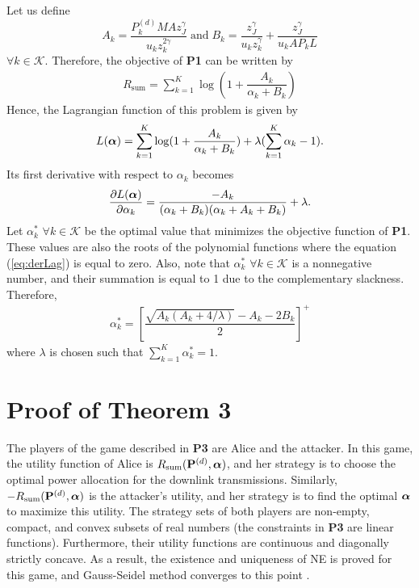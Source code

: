 \documentclass[draftclsnofoot, 12pt, onecolumn, journal]{IEEEtran}
\newcommand{\Pm}{{\bf P}}
\newcommand{\alphav}{\hbox{\boldmath$\alpha$}}
\begin{document}
Let us define $$ A_k = \frac{P_k^{(d)} M A z_J^{\gamma}}{ u_k z_k^{2\gamma} } \; \mathrm{and} \; B_k = \frac{ z_J^{\gamma} }{ u_k z_k^{\gamma} }+ \frac{ z_J^{\gamma} }{ u_k A P_k L } $$ $\forall k \in \mathcal{K} $.
Therefore, the objective of \textbf{P1} can be written by
%
\begin{align}
\label{prob:app1}
R_{\mathrm{sum}} = \sum_{k = 1}^K \log \left( 1 +  \dfrac{ A_k }{ \alpha_k + B_k } \right)
\end{align}
%
Hence, the Lagrangian function of this problem is given by
%
\begin{align}
L(\alphav) = \sum_{k=1}^K \log (1 + \dfrac{A_k}{\alpha_k + B_k}) + \lambda ( \sum_{k=1}^K \alpha_k - 1). 
\end{align}
% 
Its first derivative with respect to $\alpha_k$ becomes
%
\begin{align}
\label{eq:derLag}
\dfrac{\partial L(\alphav)}{\partial \alpha_k} = \dfrac{-A_k}{(\alpha_k + B_k)(\alpha_k + A_k + B_k)} + \lambda.
\end{align}
% 
Let $\alpha_k^*$ $\forall k \in \mathcal{K}$ be the optimal value that minimizes the objective function of \textbf{P1}. 
These values are also the roots of the polynomial functions where the equation (\ref{eq:derLag}) is equal to zero.
Also, note that $\alpha_k^*$ $\forall k \in \mathcal{K}$ is a nonnegative number, and their summation is equal to 1 due to the complementary slackness.
Therefore,
%
\begin{align}
\alpha_k^* = \left[ \dfrac{ \sqrt{A_k(A_k + 4/\lambda)} -A_k - 2B_k }{2} \right]^+
\end{align}
%
where $\lambda$ is chosen such that $\sum_{k=1}^K \alpha_k^* = 1$.

\section{Proof of Theorem 3}
\label{App:theo3}

The players of the game described in \textbf{P3} are Alice and the attacker.
In this game, the utility function of Alice is $R_{\mathrm{sum}}(\Pm^{(d)}, \alphav)$, and her strategy is to choose the optimal power allocation for the downlink transmissions.
Similarly, $-R_{\mathrm{sum}}(\Pm^{(d)}, \alphav)$ is the attacker's utility, and her strategy is to find the optimal $\alphav$ to maximize this utility.
The strategy sets of both players are non-empty, compact, and convex subsets of real numbers (the constraints in \textbf{P3} are linear functions).
Furthermore, their utility functions are continuous and diagonally strictly concave.
As a result, the existence and uniqueness of NE is proved for this game, and
Gauss-Seidel method converges to this point \cite{cominetti2012modern}.
 
\end{document}
